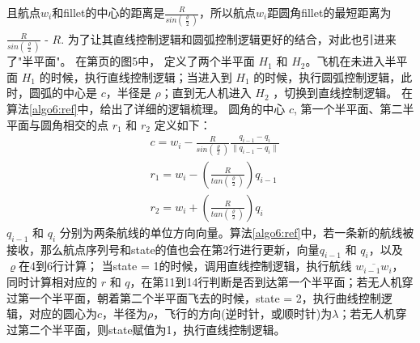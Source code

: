 \documentclass[UTF8,a4paper,10pt,nocolorlinks]{ctexart}
\newcommand{\upcite}[1]{\textsuperscript{\textsuperscript{\cite{#1}}}}
\begin{document}
    且航点$w_{i}$和fillet的中心的距离是$\frac{R}{sin(\frac{\varrho}{2})}$，所以航点$w_{i}$距圆角fillet的最短距离为$\frac{R}{sin(\frac{\varrho}{2})}$ - $R$.
    为了让其直线控制逻辑和圆弧控制逻辑\upcite{8}更好的结合，对此也引进来了"半平面"。
    在第\pageref{algo6_1}页的图5中，
    定义了两个半平面 \textit{$H_{1}$} 和 \textit{$H_{2}$}。飞机在未进入半平面 \textit{$H_{1}$}
    的时候，执行直线控制逻辑；当进入到 \textit{$H_{1}$} 的时候，执行圆弧控制逻辑，此时，圆弧的中心是 $c$，半径是 $\rho$；直到无人机进入 \textit{$H_{2}$} ，切换到直线控制逻辑。
    在算法\ref{algo6:ref}中，给出了详细的逻辑梳理。
    圆角的中心 $c$, 第一个半平面、第二半平面与圆角相交的点 $r_{1}$ 和 $r_{2}$ 定义如下：
        \begin{align}
            &c = w_{i} - \frac{R}{sin(\frac{\varrho}{2})} \frac{q_{i-1}-q_{i}}{\lVert q_{i-1}-q_{i} \rVert} \\
            &r_{1} = w_{i} - \left( \frac{R}{tan(\frac{\varrho}{2})} \right)q_{i-1} \\
            &r_{2} = w_{i} + \left( \frac{R}{tan(\frac{\varrho}{2})} \right)q_{i}
        \end{align}
     $q_{i-1}$ 和 $q_{i}$ 分别为两条航线的单位方向向量。算法\ref{algo6:ref}中，若一条新的航线被接收，那么航点序列号和state的值也会在第2行进行更新，向量$q_{i-1}$ 和 $q_{i}$，以及$\varrho$在4到6行计算；
    当state = 1的时候，调用直线控制逻辑，执行航线 $\overline{w_{i-1}w_{i}}$，同时计算相对应的 $r$ 和 $q$，在第11到14行判断是否到达第一个半平面；若无人机穿过第一个半平面，朝着第二个半平面飞去的时候，state = 2，执行曲线控制逻辑，对应的圆心为$c$，半径为$\rho$，飞行的方向(逆时针，或顺时针)为$\lambda$；若无人机穿过第二个半平面，则state赋值为1，执行直线控制逻辑。

    
\end{document}
